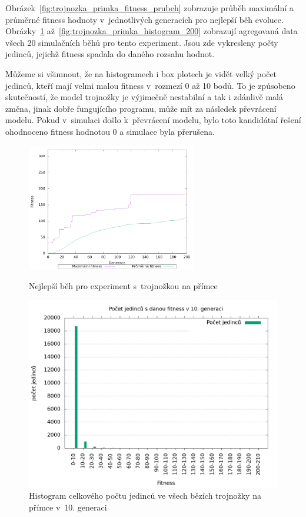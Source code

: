 Obrázek~\ref{fig:trojnozka_primka_fitness_prubeh} zobrazuje průběh maximální a průměrné fitness hodnoty v~jednotlivých generacích pro nejlepší běh evoluce.
Obrázky~\ref{fig:trojnozka_primka_histogram_10} až~\ref{fig:trojnozka_primka_histogram_200} zobrazují agregovaná data všech 20 simulačních běhů pro tento experiment.
Jsou zde vykresleny počty jedinců, jejichž fitness spadala do daného rozsahu hodnot.

Můžeme si všimnout, že na histogramech i box plotech je vidět velký počet jedinců, kteří mají velmi malou fitness v~rozmezí 0 až 10 bodů.
To je způsobeno skutečností, že model trojnožky je výjimečně nestabilní a tak i zdánlivě malá změna, jinak dobře fungujícího programu, může mít za následek převrácení modelu.
Pokud v~simulaci došlo k~převrácení modelu, bylo toto kandidátní řešení ohodnoceno fitness hodnotou 0 a simulace byla přerušena.


\begin{figure}[h]
    \begin{minipage}[c]{0.48\linewidth}
    {\includegraphics[width=20em]{obrazky/trojnozka_primka_fitness_prubeh.png}}
        \caption{
            Nejlepší běh pro experiment s~trojnožkou na přímce
        }
        \label{fig:trojnozka_primka_fitness_prubeh}
    \end{minipage}
    \hfill
    \begin{minipage}[c]{0.48\linewidth}
        \includegraphics[width=\linewidth]{obrazky/trojnozka_primka_fitnessHistogram10.png}
        \caption{Histogram celkového počtu jedinců ve všech bězích trojnožky na přímce v~10. generaci}
        \label{fig:trojnozka_primka_histogram_10}
    \end{minipage}
\end{figure}

